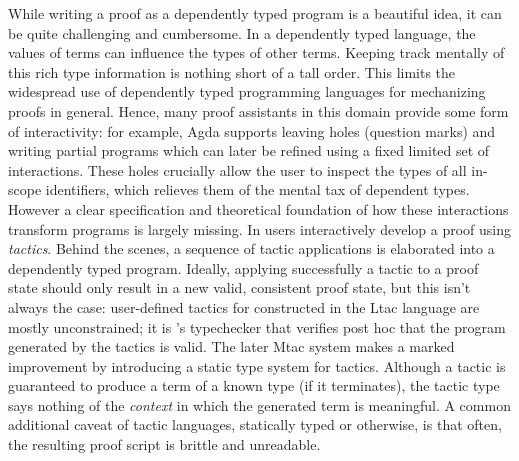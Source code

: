 While writing a proof as a dependently typed program is a beautiful idea, it
can be quite challenging and cumbersome.
In a dependently typed language, the values of terms can influence the types of
other terms.
Keeping track mentally of this rich type information is nothing short of a tall
order.
This limits the widespread use of dependently typed programming languages for
mechanizing proofs in general.
Hence, many proof assistants in this domain provide some form
of interactivity: for example, Agda \cite{Norell:phd07} supports leaving holes
(question marks) and writing partial programs which can later be refined using a
fixed limited set of interactions.
These holes crucially allow the user to inspect the types of all in-scope
identifiers, which relieves them of the mental tax of dependent types.
However a clear specification and theoretical foundation of how these
interactions transform programs is largely missing.
In \Coq{} \cite{bertot/casteran:2004} users interactively develop a proof using
\emph{tactics}.
Behind the scenes, a sequence of tactic applications is elaborated into a
dependently typed program.
Ideally, applying successfully a tactic to a proof state should only result in a
new valid, consistent proof state, but this isn't always the case: user-defined
tactics for \Coq{} constructed in the Ltac language \cite{Delahaye:LPAR00} are
mostly unconstrained; it is \Coq's typechecker that verifies post hoc that the
program generated by the tactics is valid.
The later Mtac system \cite{mtac2} makes a marked improvement by introducing a
static type system for tactics.
Although a tactic is guaranteed to produce a term of a known type
(if it terminates), the tactic type says nothing of the \emph{context} in which
the generated term is meaningful.
A common additional caveat of tactic languages, statically typed or otherwise,
is that often, the resulting proof script is brittle and unreadable.

